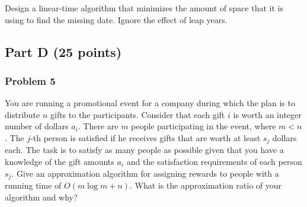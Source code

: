 \documentclass[11pt]{article}
\begin{document}
Design a linear-time algorithm that minimizes the amount of space that
it is using to find the missing date. Ignore the effect of leap years.

\subsection*{Part D (25 points)}

\subsubsection*{Problem 5} 

You are running a promotional event for a
company during which the plan is to distribute $n$ gifts to the
participants. Consider that each gift $i$ is worth an integer number
of dollars $a_i$. There are $m$ people participating in the event,
where $m < n$. The $j$-th person is satisfied if he receives gifts
that are worth at least $s_j$ dollars each. The task is to satisfy as
many people as possible given that you have a knowledge of the gift
amounts $a_i$ and the satisfaction requirements of each person
$s_j$. Give an approximation algorithm for assigning rewards to people
with a running time of $O(m\log m+n)$. What is the approximation ratio
of your algorithm and why?
\end{document}
